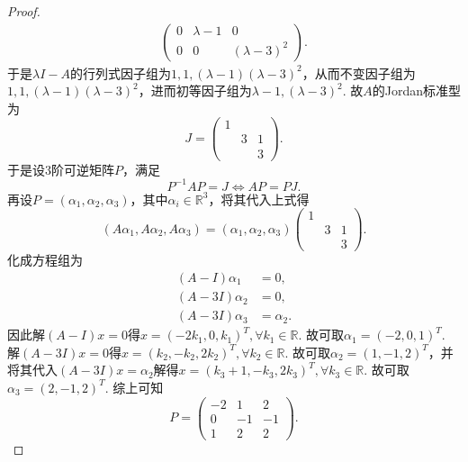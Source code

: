 \documentclass[../../main.tex]{subfiles}%
\begin{document}
\begin{proof}
\begin{align*}
\begin{pmatrix}
0 & \lambda - 1 & 0 \\
0 & 0 & (\lambda - 3)^2
\end{pmatrix}.
\end{align*}
于是$\lambda I - A$的行列式因子组为$1, 1, (\lambda - 1)(\lambda - 3)^2$，从而不变因子组为$1, 1, (\lambda - 1)(\lambda - 3)^2$，进而初等因子组为$\lambda - 1, (\lambda - 3)^2$.
故$A$的Jordan标准型为
\[
J = 
\begin{pmatrix}
1 & & \\
& 3 & 1 \\
& & 3
\end{pmatrix}.
\]
于是设3阶可逆矩阵$P$，满足
\[
P^{-1}AP = J \Longleftrightarrow AP = PJ.
\]
再设$P = (\alpha_1, \alpha_2, \alpha_3)$，其中$\alpha_i \in \mathbb{R}^3$，将其代入上式得
\[
(A\alpha_1, A\alpha_2, A\alpha_3) = (\alpha_1, \alpha_2, \alpha_3)
\begin{pmatrix}
1 & & \\
& 3 & 1 \\
& & 3
\end{pmatrix}.
\]
化成方程组为
\begin{align*}
(A - I)\alpha_1 &= 0, \\
(A - 3I)\alpha_2 &= 0, \\
(A - 3I)\alpha_3 &= \alpha_2.
\end{align*}
因此解$(A - I)x = 0$得$x = (-2k_1, 0, k_1)^T, \forall k_1 \in \mathbb{R}$. 故可取$\alpha_1 = (-2, 0, 1)^T$. 解$(A - 3I)x = 0$得$x = (k_2, -k_2, 2k_2)^T, \forall k_2 \in \mathbb{R}$. 故可取$\alpha_2 = (1, -1, 2)^T$，并将其代入$(A - 3I)x = \alpha_2$解得$x = (k_3 + 1, -k_3, 2k_3)^T, \forall k_3 \in \mathbb{R}$. 故可取$\alpha_3 = (2, -1, 2)^T$.
综上可知
\[
P = 
\begin{pmatrix}
-2 & 1 & 2 \\
0 & -1 & -1 \\
1 & 2 & 2
\end{pmatrix}.
\]

\end{proof}
\end{document}
